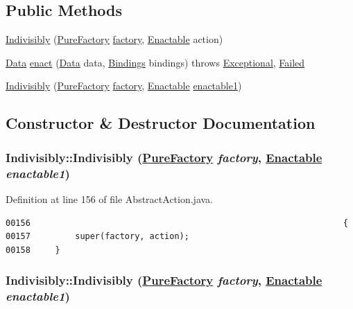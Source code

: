 \subsection*{Public Methods}
\begin{CompactItemize}
\item 
\hyperlink{classIndivisibly_a0}{Indivisibly} (\hyperlink{classPureFactory}{Pure\-Factory} \hyperlink{classDataImpl_o0}{factory}, \hyperlink{interfaceEnactable}{Enactable} action)
\item 
\hyperlink{interfaceData}{Data} \hyperlink{classIndivisibly_a1}{enact} (\hyperlink{interfaceData}{Data} data, \hyperlink{interfaceBindings}{Bindings} bindings) throws \hyperlink{classExceptional}{Exceptional}, \hyperlink{classFailed}{Failed}
\item 
\hyperlink{classIndivisibly_a2}{Indivisibly} (\hyperlink{classPureFactory}{Pure\-Factory} \hyperlink{classDataImpl_o0}{factory}, \hyperlink{interfaceEnactable}{Enactable} \hyperlink{classAbstractPrefixCombinator_n0}{enactable1})
\end{CompactItemize}


\subsection{Constructor \& Destructor Documentation}
\hypertarget{classIndivisibly_a0}{
\subsubsection[Indivisibly]{\setlength{\rightskip}{0pt plus 5cm}Indivisibly::Indivisibly (\hyperlink{classPureFactory}{Pure\-Factory} {\em factory}, \hyperlink{interfaceEnactable}{Enactable} {\em enactable1})}}
\label{classIndivisibly_a0}




Definition at line 156 of file Abstract\-Action.java.\footnotesize\begin{verbatim}00156                                                               {
00157         super(factory, action);
00158     }
\end{verbatim}\normalsize 
\hypertarget{classIndivisibly_a2}{
\subsubsection[Indivisibly]{\setlength{\rightskip}{0pt plus 5cm}Indivisibly::Indivisibly (\hyperlink{classPureFactory}{Pure\-Factory} {\em factory}, \hyperlink{interfaceEnactable}{Enactable} {\em enactable1})}}
\label{classIndivisibly_a2}




